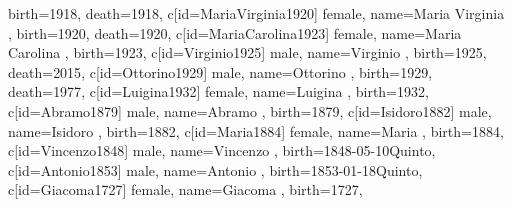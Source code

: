 \documentclass{article}
\begin{document}
\begin{midpage}
\begin{center}
\begin{genealogypicture}
{{{{{{{{{                                    birth={1918}{},
                                    death={1918}{},
                                }
                                c[id=MariaVirginia1920]{
                                    female,
                                    name={Maria Virginia },
                                    birth={1920}{},
                                    death={1920}{},
                                }
                                c[id=MariaCarolina1923]{
                                    female,
                                    name={Maria Carolina },
                                    birth={1923}{},
                                }
                                c[id=Virginio1925]{
                                    male,
                                    name={Virginio },
                                    birth={1925}{},
                                    death={2015}{},
                                }
                                c[id=Ottorino1929]{
                                    male,
                                    name={Ottorino },
                                    birth={1929}{},
                                    death={1977}{},
                                }
                                c[id=Luigina1932]{
                                    female,
                                    name={Luigina },
                                    birth={1932}{},
                                }
                            }
                            c[id=Abramo1879]{
                                male,
                                name={Abramo },
                                birth={1879}{},
                            }
                            c[id=Isidoro1882]{
                                male,
                                name={Isidoro },
                                birth={1882}{},
                            }
                            c[id=Maria1884]{
                                female,
                                name={Maria },
                                birth={1884}{},
                            }
                        }
                        c[id=Vincenzo1848]{
                            male,
                            name={Vincenzo },
                            birth={1848-05-10}{Quinto},
                        }
                        c[id=Antonio1853]{
                            male,
                            name={Antonio },
                            birth={1853-01-18}{Quinto},
                        }
                    }
                }
            }
            c[id=Giacoma1727]{
                female,
                name={Giacoma },
                birth={1727}{},
            }
        }
    }
}
\end{genealogypicture}

\end{center}
\end{midpage}
\end{document}
